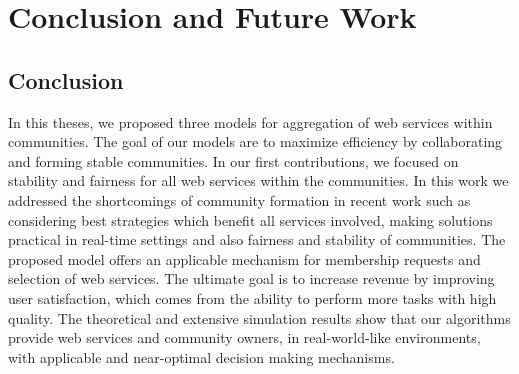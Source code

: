 \chapter{Conclusion and Future Work}\label{Chap5:Conclusion}

\section{Conclusion}

In this theses, we proposed three models for aggregation of web services within communities. The goal of our models are to maximize efficiency by collaborating and forming stable communities. In our first contributions, we focused on stability and fairness for all web services within the communities. In this work we addressed the shortcomings of community formation in recent work such as considering best strategies which benefit all services involved, making solutions practical in real-time settings and also fairness and stability of communities. The proposed model offers an applicable mechanism for membership requests and selection of web services. The ultimate goal is to increase revenue by improving user satisfaction, which comes from the ability to perform more tasks with high quality. The theoretical and extensive simulation results show that our algorithms provide web services and community owners, in real-world-like environments, with applicable and near-optimal decision making mechanisms.

